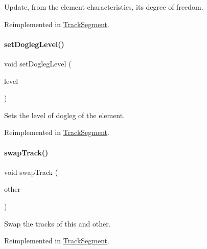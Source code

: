 Update, from the element characteristics, it\textquotesingle{}s degree of freedom. 

Reimplemented in \hyperlink{classKite_1_1TrackSegment_af5332d647c0482aa90ad7cc9b2a50f3a}{Track\+Segment}.

\mbox{\label{classKite_1_1TrackElement_a2b90319cb042b283aa5d1fdb1992f11f}} 
\paragraph{\texorpdfstring{set\+Dogleg\+Level()}{setDoglegLevel()}}
{\footnotesize\ttfamily void set\+Dogleg\+Level (\begin{DoxyParamCaption}\item[{unsigned int}]{level }\end{DoxyParamCaption})\hspace{0.3cm}{\ttfamily [virtual]}}

Sets the level of dogleg of the element. 

Reimplemented in \hyperlink{classKite_1_1TrackSegment_a2b90319cb042b283aa5d1fdb1992f11f}{Track\+Segment}.

\mbox{\label{classKite_1_1TrackElement_acc245ce084989d1c34816d0e61b9d510}} 
\paragraph{\texorpdfstring{swap\+Track()}{swapTrack()}}
{\footnotesize\ttfamily void swap\+Track (\begin{DoxyParamCaption}\item[{\hyperlink{classKite_1_1TrackElement}{Track\+Element} $\ast$}]{other }\end{DoxyParamCaption})\hspace{0.3cm}{\ttfamily [virtual]}}

Swap the tracks of {\ttfamily this} and {\ttfamily other}. 

Reimplemented in \hyperlink{classKite_1_1TrackSegment_acc245ce084989d1c34816d0e61b9d510}{Track\+Segment}.

